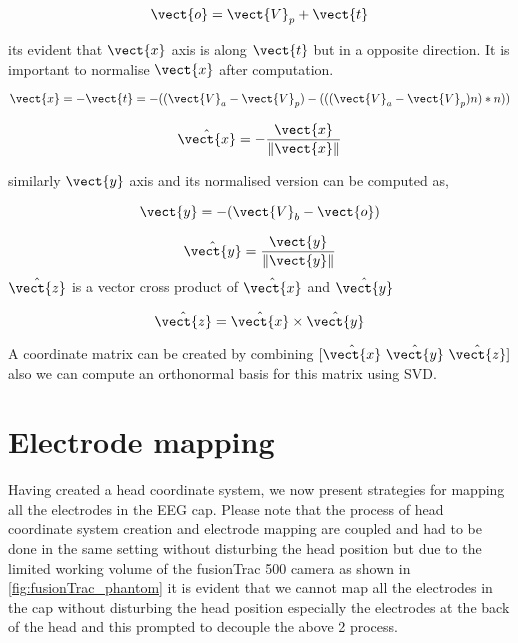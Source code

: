 \begin{equation*}
\vect{o} = \vect{V}_p + \vect{t}
\end{equation*}

its evident that $\vect{x}$ axis is along $\vect{t}$ but in a opposite direction. It is important to normalise $\vect{x}$ after computation.

\begin{equation*}
\vect{x} = - \vect{t} = - ((\vect{V}_a - \vect{V}_p) - (((\vect{V}_a - \vect{V}_p)n)*n))
\end{equation*}

\begin{equation}
\hat{\vect{x}} = -\frac{\vect{x}}{\| \vect{x} \|}
\end{equation}

similarly $\vect{y}$ axis and its normalised version can be computed as, 

\begin{equation*}
\vect{y} = - (\vect{V}_b - \vect{o})
\end{equation*} 

\begin{equation}
\hat{\vect{y}} = \frac{\vect{y}}{\| \vect{y} \|}
\end{equation} 
\noindent $ \hat{\vect{z}}$ is a vector cross product of $ \hat{\vect{x}}$ and $ \hat{\vect{y}}$

 
\begin{equation}
\hat{\vect{z}} = \hat{\vect{x}} \times \hat{\vect{y}}
\end{equation} 

\noindent A coordinate matrix can be created by combining $[\hat{\vect{x}}\  \hat{\vect{y}}\  \hat{\vect{z}}] $ also we can compute an orthonormal basis for this matrix using SVD.

\section{Electrode mapping} Having created a head coordinate system, we now present strategies for mapping all the electrodes in the EEG cap. Please note that the process of head coordinate system creation and electrode mapping are coupled and had to be done in the same setting without disturbing the head position but due to the limited working volume of the fusionTrac 500 camera as shown in \cref{fig:fusionTrac_phantom} it is evident that we cannot map all the electrodes in the cap without disturbing the head position especially the electrodes at the back of the head and this prompted to decouple the above 2 process. 


